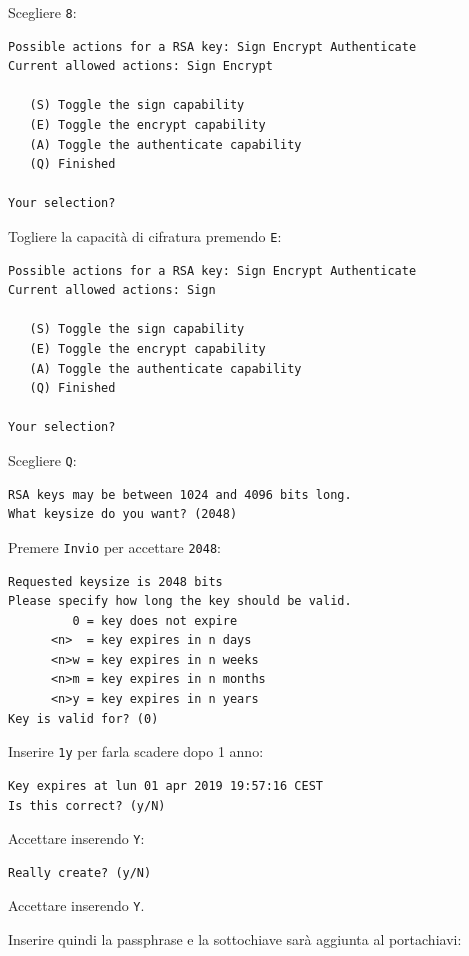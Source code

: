 \documentclass[a4paper,10pt]{article}
\begin{document}
Scegliere \texttt{8}:

\begin{lstlisting}
Possible actions for a RSA key: Sign Encrypt Authenticate
Current allowed actions: Sign Encrypt

   (S) Toggle the sign capability
   (E) Toggle the encrypt capability
   (A) Toggle the authenticate capability
   (Q) Finished

Your selection?
\end{lstlisting}

Togliere la capacità di cifratura premendo \texttt{E}:

\begin{lstlisting}
Possible actions for a RSA key: Sign Encrypt Authenticate
Current allowed actions: Sign

   (S) Toggle the sign capability
   (E) Toggle the encrypt capability
   (A) Toggle the authenticate capability
   (Q) Finished

Your selection?
\end{lstlisting}

Scegliere \texttt{Q}:

\begin{lstlisting}
RSA keys may be between 1024 and 4096 bits long.
What keysize do you want? (2048)
\end{lstlisting}

Premere \texttt{Invio} per accettare \texttt{2048}:

\begin{lstlisting}
Requested keysize is 2048 bits
Please specify how long the key should be valid.
         0 = key does not expire
      <n>  = key expires in n days
      <n>w = key expires in n weeks
      <n>m = key expires in n months
      <n>y = key expires in n years
Key is valid for? (0)
\end{lstlisting}

Inserire \texttt{1y} per farla scadere dopo 1 anno:

\begin{lstlisting}
Key expires at lun 01 apr 2019 19:57:16 CEST
Is this correct? (y/N)
\end{lstlisting}

Accettare inserendo \texttt{Y}:

\begin{lstlisting}
Really create? (y/N)
\end{lstlisting}

Accettare inserendo \texttt{Y}.

Inserire quindi la passphrase e la sottochiave sarà aggiunta al portachiavi:
\end{document}
